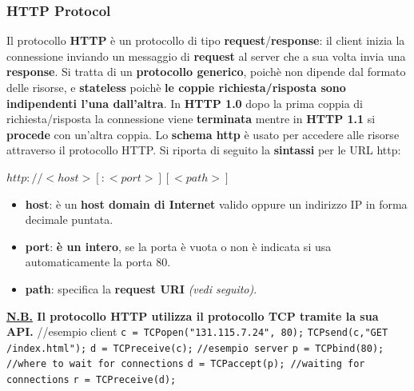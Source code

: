 \documentclass[11pt,a4paper]{article}
\theoremstyle{definition}
\begin{document}
\subsubsection{HTTP Protocol}
\label{sec:HTTP Protocol}
Il protocollo \textbf{HTTP} è un protocollo di tipo \textbf{request}/\textbf{response}: il client inizia la connessione inviando un messaggio di \textbf{request} al server che a sua volta invia una \textbf{response}. Si tratta di un \textbf{protocollo generico}, poichè non dipende dal formato delle risorse, e \textbf{stateless} poichè \textbf{le coppie richiesta/risposta sono indipendenti l'una dall'altra}. In \textbf{HTTP 1.0} dopo la prima coppia di richiesta/risposta la connessione viene \textbf{terminata} mentre in \textbf{HTTP 1.1} si \textbf{procede} con un’altra coppia. \newline
Lo \textbf{schema http} è usato per accedere alle risorse attraverso il protocollo HTTP. \newpage
Si riporta di seguito la \textbf{sintassi} per le URL http:\newline\newline
\centerline{\LARGE$http: // <host> [ : <port> ] [ <path> ]$}
\begin{itemize}
	\item \textbf{host}: è un \textbf{host domain di Internet} valido oppure un indirizzo IP in forma decimale puntata.
	\item \textbf{port}: \textbf{è un intero}, se  la porta è vuota o non è indicata si usa automaticamente la porta 80.
	\item \textbf{path}: specifica la \textbf{request URI} \textit{(vedi seguito)}.
\end{itemize}
\textbf{\underline{N.B.} Il protocollo HTTP utilizza il protocollo TCP tramite la sua API.}\newline\newline
//esempio client\newline
\texttt{c = TCPopen("131.115.7.24", 80);}\newline
\texttt{TCPsend(c,"GET /index.html");}\newline
\texttt{d = TCPreceive(c);}\newline\newline
\texttt{//esempio server}\newline
\texttt{p = TCPbind(80); //where to wait for connections}\newline
\texttt{d = TCPaccept(p); //waiting for connections}\newline
\texttt{r = TCPreceive(d);}\newline
\end{document}
